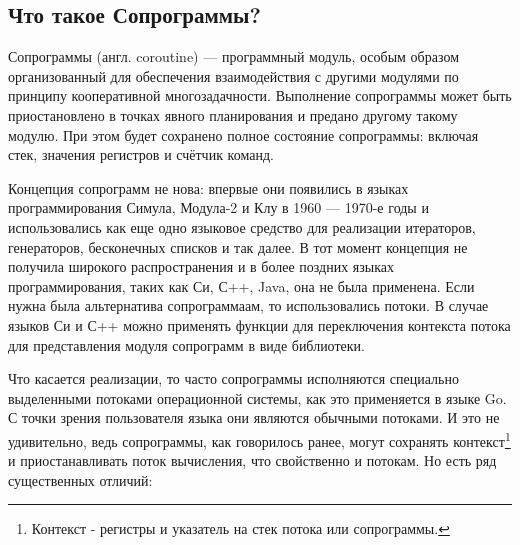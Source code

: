 	\subsection{Что такое Сопрограммы?}
	Сопрограммы (англ. coroutine) — программный модуль, особым образом организованный для обеспечения взаимодействия с другими модулями по принципу кооперативной многозадачности\cite{coroutine}. Выполнение сопрограммы может быть
	приостановлено в точках явного планирования и предано другому такому модулю. При этом будет сохранено полное
	состояние сопрограммы: включая стек, значения регистров и счётчик команд.
	\par
	Концепция сопрограмм не нова: впервые они появились в языках программирования Симула\cite{simula},
	Модула-2\cite{modula} и Клу\cite{clu} в 1960 — 1970-е годы и использовались как еще одно языковое средство для
	реализации итераторов, генераторов, бесконечных списков и так далее. В
	тот момент концепция не получила широкого распространения и в более поздних языках
	программирования, таких как Си, С++, Java, она не была применена. Если нужна была
	альтернатива сопрограммаам, то использовались потоки. В случае языков Си и С++ можно применять функции для
	переключения контекста потока для представления модуля сопрограмм в виде библиотеки.
	\par
	Что касается реализации, то часто сопрограммы исполняются специально выделенными потоками операционной системы, как
	это применяется в языке Go. С точки зрения пользователя языка они являются обычными потоками.
	И это не удивительно, ведь сопрограммы, как говорилось ранее, могут сохранять контекст\footnote{Контекст - регистры и указатель на стек потока или сопрограммы.} и
	приостанавливать поток вычисления, что свойственно и потокам. Но есть ряд существенных отличий:
